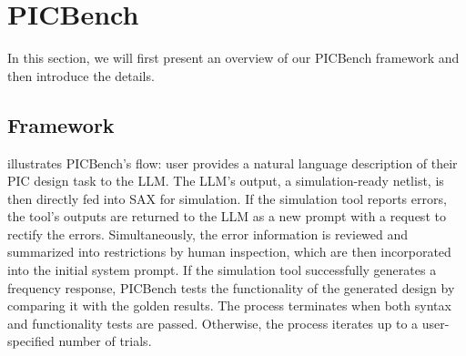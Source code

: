 \section{PICBench}
\label{sec:method}
In this section, we will first present an overview of our PICBench framework and then introduce the details.

\subsection{Framework}
 illustrates PICBench's flow: user provides a natural language description of their PIC design task to the LLM. 
The LLM’s output, a simulation-ready netlist, is then directly fed into SAX for simulation.
If the simulation tool reports errors, the tool’s outputs are returned to the LLM as a new prompt with a request to rectify the errors. Simultaneously, the error information is reviewed and summarized into restrictions by human inspection, which are then incorporated into the initial system prompt. 
If the simulation tool successfully generates a frequency response, PICBench tests the functionality of the generated design by comparing it with the golden results. 
The process terminates when both syntax and functionality tests are passed.
Otherwise, the process iterates up to a user-specified number of trials.


